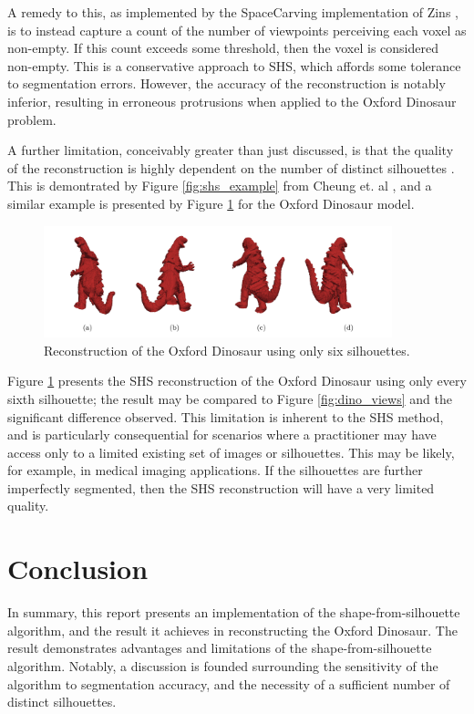 A remedy to this, as implemented by the SpaceCarving implementation of Zins \cite{zins_2019}, is to instead capture a count of the number of viewpoints perceiving each voxel as non-empty. If this count exceeds some threshold, then the voxel is considered non-empty. This is a conservative approach to SHS, which affords some tolerance to segmentation errors. However, the accuracy of the reconstruction is notably inferior, resulting in erroneous protrusions when applied to the Oxford Dinosaur problem.

A further limitation, conceivably greater than just discussed, is that the quality of the reconstruction is highly dependent on the number of distinct silhouettes \cite{cheung_2005}. This is demontrated by Figure \ref{fig:shs_example} from Cheung et. al \cite{cheung_2005}, and a similar example is presented by Figure \ref{fig:bad_reconstruction} for the Oxford Dinosaur model.

\begin{figure}[ht]
  \centering
  \includegraphics[width=0.9\textwidth]{images/q2_bad_reconstruction.png}
  \caption{Reconstruction of the Oxford Dinosaur using only six silhouettes.}
  \label{fig:bad_reconstruction}
\end{figure}

Figure \ref{fig:bad_reconstruction} presents the SHS reconstruction of the Oxford Dinosaur using only every sixth silhouette; the result may be compared to Figure \ref{fig:dino_views} and the significant difference observed. This limitation is inherent to the SHS method, and is particularly consequential for scenarios where a practitioner may have access only to a limited existing set of images or silhouettes. This may be likely, for example, in medical imaging applications. If the silhouettes are further imperfectly segmented, then the SHS reconstruction will have a very limited quality.

\section{Conclusion}

In summary, this report presents an implementation of the shape-from-silhouette algorithm, and the result it achieves in reconstructing the Oxford Dinosaur. The result demonstrates advantages and limitations of the shape-from-silhouette algorithm. Notably, a discussion is founded surrounding the sensitivity of the algorithm to segmentation accuracy, and the necessity of a sufficient number of distinct silhouettes.
